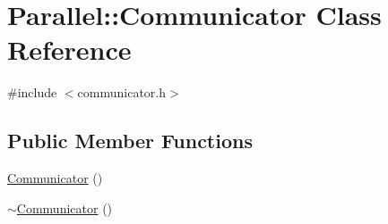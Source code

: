 \hypertarget{class_parallel_1_1_communicator}{}\section{Parallel\+::Communicator Class Reference}
\label{class_parallel_1_1_communicator}


{\ttfamily \#include $<$communicator.\+h$>$}

\subsection*{Public Member Functions}
\begin{DoxyCompactItemize}
\item 
\mbox{\hyperlink{class_parallel_1_1_communicator_ae4242fefd3f34197fab482141ce08550}{Communicator}} ()
\item 
\mbox{\hyperlink{class_parallel_1_1_communicator_ac1e7afc1984908e5a44a713e37131f0a}{$\sim$\+Communicator}} ()
\end{DoxyCompactItemize}
